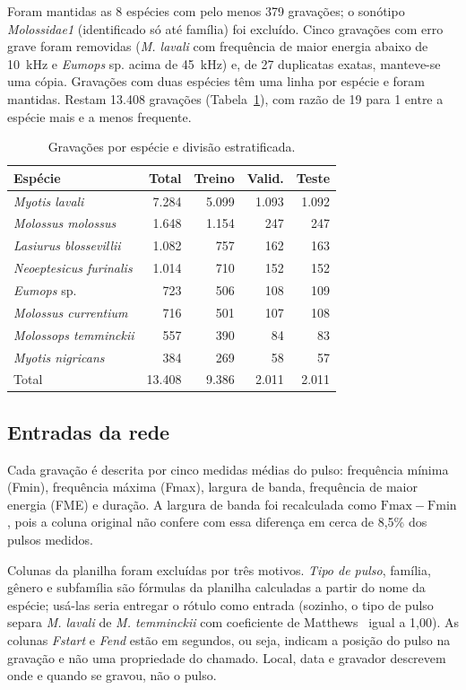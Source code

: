 \documentclass{sbrt}
\begin{document}
Foram mantidas as 8 espécies com pelo menos 379 gravações; o sonótipo \textit{Molossidae1} (identificado só até família) foi excluído. Cinco gravações com erro grave foram removidas (\textit{M. lavali} com frequência de maior energia abaixo de 10~kHz e \textit{Eumops} sp. acima de 45~kHz) e, de 27 duplicatas exatas, manteve-se uma cópia. Gravações com duas espécies têm uma linha por espécie e foram mantidas. Restam 13.408 gravações (Tabela~\ref{tab:dados}), com razão de 19 para 1 entre a espécie mais e a menos frequente.

\begin{table}[htb]
\caption{\label{tab:dados}Gravações por espécie e divisão estratificada.}
\begin{center}
\begin{tabular}{lrrrr}\hline
Espécie & Total & Treino & Valid. & Teste\\\hline
\textit{Myotis lavali} & 7.284 & 5.099 & 1.093 & 1.092\\
\textit{Molossus molossus} & 1.648 & 1.154 & 247 & 247\\
\textit{Lasiurus blossevillii} & 1.082 & 757 & 162 & 163\\
\textit{Neoeptesicus furinalis} & 1.014 & 710 & 152 & 152\\
\textit{Eumops} sp. & 723 & 506 & 108 & 109\\
\textit{Molossus currentium} & 716 & 501 & 107 & 108\\
\textit{Molossops temminckii} & 557 & 390 & 84 & 83\\
\textit{Myotis nigricans} & 384 & 269 & 58 & 57\\\hline
Total & 13.408 & 9.386 & 2.011 & 2.011\\\hline
\end{tabular}
\end{center}
\end{table}

\subsection{Entradas da rede}

Cada gravação é descrita por cinco medidas médias do pulso: frequência mínima (Fmin), frequência máxima (Fmax), largura de banda, frequência de maior energia (FME) e duração. A largura de banda foi recalculada como $\mathrm{Fmax}-\mathrm{Fmin}$, pois a coluna original não confere com essa diferença em cerca de 8,5\% dos pulsos medidos.

Colunas da planilha foram excluídas por três motivos. \textit{Tipo de pulso}, família, gênero e subfamília são fórmulas da planilha calculadas a partir do nome da espécie; usá-las seria entregar o rótulo como entrada (sozinho, o tipo de pulso separa \textit{M. lavali} de \textit{M. temminckii} com coeficiente de Matthews~\cite{matthews} igual a 1,00). As colunas \textit{Fstart} e \textit{Fend} estão em segundos, ou seja, indicam a posição do pulso na gravação e não uma propriedade do chamado. Local, data e gravador descrevem onde e quando se gravou, não o pulso.
\end{document}
